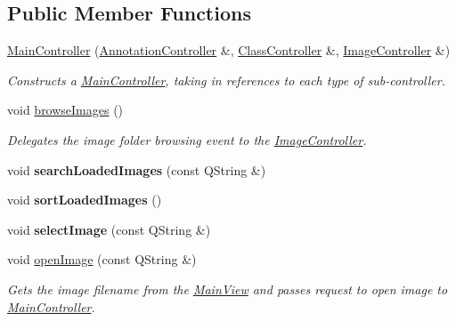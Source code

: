 \subsection*{Public Member Functions}
\begin{DoxyCompactItemize}
\item 
\hyperlink{classMainController_a1ec0f2ef4a8efce169354c525afec025}{Main\+Controller} (\hyperlink{classAnnotationController}{Annotation\+Controller} \&, \hyperlink{classClassController}{Class\+Controller} \&, \hyperlink{classImageController}{Image\+Controller} \&)
\begin{DoxyCompactList}\small\item\em Constructs a \hyperlink{classMainController}{Main\+Controller}, taking in references to each type of sub-\/controller. \end{DoxyCompactList}\item 
\mbox{\label{classMainController_a9839c3a1b6fac7c4ee47479f86666c2b}} 
void \hyperlink{classMainController_a9839c3a1b6fac7c4ee47479f86666c2b}{browse\+Images} ()
\begin{DoxyCompactList}\small\item\em Delegates the image folder browsing event to the \hyperlink{classImageController}{Image\+Controller}. \end{DoxyCompactList}\item 
\mbox{\label{classMainController_a9513dcff8f9540bba40a69b858596961}} 
void {\bfseries search\+Loaded\+Images} (const Q\+String \&)
\item 
\mbox{\label{classMainController_a1a2d138aa215dc8e2577cc44956595af}} 
void {\bfseries sort\+Loaded\+Images} ()
\item 
\mbox{\label{classMainController_a528a8b9b2aeee5dd416dc1e57da56693}} 
void {\bfseries select\+Image} (const Q\+String \&)
\item 
void \hyperlink{classMainController_a44cb414d5932db864383b9cb17c6f0b1}{open\+Image} (const Q\+String \&)
\begin{DoxyCompactList}\small\item\em Gets the image filename from the \hyperlink{classMainView}{Main\+View} and passes request to open image to \hyperlink{classMainController}{Main\+Controller}. \end{DoxyCompactList}\item 

\end{DoxyCompactItemize}
